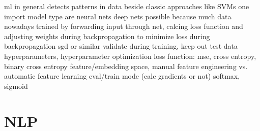 ml in general detects patterns in data
beside classic approaches like SVMs one import model type are neural nets
deep nets possible because much data nowadays
trained by forwarding input through net, calcing loss function and adjusting weights during backpropagation to minimize loss
during backpropagation sgd or similar
validate during training, keep out test data
hyperparameters, hyperparameter optimization
loss function: mse, cross entropy, binary cross entropy
feature/embedding space, manual feature engineering vs. automatic feature learning
eval/train mode (calc gradients or not)
softmax, sigmoid

\section{NLP}
\label{sec:3_basics/3_neural_networks/1_nlp}

